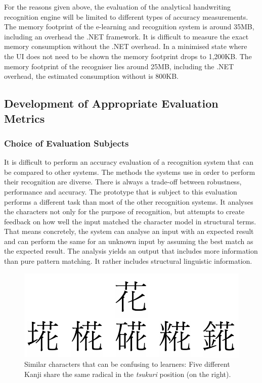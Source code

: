For the reasons given above, the evaluation of the analytical handwriting 
recognition engine will be limited to different types of accuracy measurements.
The memory footprint of the e-learning and recognition system is around 35MB,
including an overhead the .NET framework. It is difficult to measure the
exact memory consumption without the .NET overhead. In a minimised state 
where the UI does not need to be shown the memory footprint drops to
1,200KB. The memory footprint of the recogniser lies around 25MB, including the
.NET overhead, the estimated consumption without is 800KB.

\subsection{Development of Appropriate Evaluation Metrics}
\label{sec:eval:developmentofevalmetrics}

\subsubsection{Choice of Evaluation Subjects}
\label{sec:eval:evaluationsubjects}
It is difficult to perform an accuracy evaluation of a recognition system
that can be compared to other systems. The methods the systems use in order
to perform their recognition are diverse. There is always a trade-off between
robustness, performance and accuracy.
The prototype that is subject to this evaluation performs a different
task than most of the other recognition systems. It analyses the characters
not only for the purpose of recognition, but attempts to create feedback on
how well the input matched the character model in structural terms.
That means concretely, the system can analyse an input with an expected result
and can perform the same for an unknown input by assuming the best match
as the expected result. The analysis yields an output that includes more
information than pure pattern matching. It rather includes structural linguistic 
information.

\begin{figure}[htbp]
  \begin{center}
    \includegraphics[scale=0.4]{images/simlarCharaters.png}
    \caption{Similar characters that can be confusing to learners: Five different Kanji share the same radical in the \emph{tsukuri} position (on the right).}
    \label{fig:similarcharactersforuserconfusion}
  \end{center}
\end{figure}

